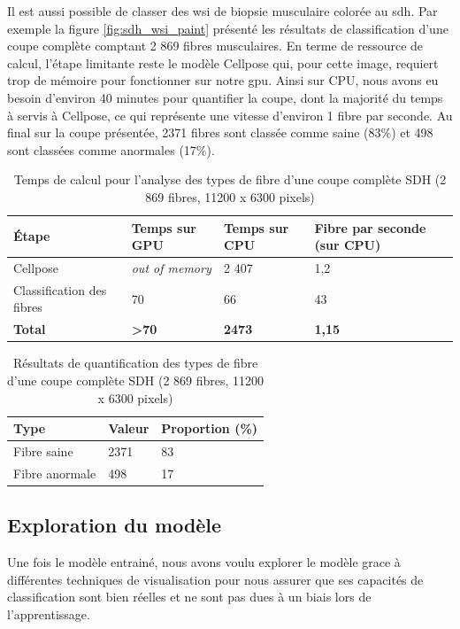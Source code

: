 Il est aussi possible de classer des \gls{wsi} de biopsie musculaire colorée au \gls{sdh}. Par exemple la figure \ref{fig:sdh_wsi_paint} présenté les résultats de classification d'une coupe complète comptant 2 869 fibres musculaires. En terme de ressource de calcul, l'étape limitante reste le modèle Cellpose qui, pour cette image, requiert trop de mémoire pour fonctionner sur notre \gls{gpu}. Ainsi sur CPU, nous avons eu besoin d'environ 40 minutes pour quantifier la coupe, dont la majorité du temps à servis à Cellpose,  ce qui représente une vitesse d'environ 1 fibre par seconde. Au final sur la coupe présentée, 2371 fibres sont classée comme saine (83\%) et 498 sont classées comme anormales (17\%).

\begin{table}[htbp]
\centering
\caption{Temps de calcul pour l'analyse des types de fibre d'une coupe complète SDH (2 869 fibres, 11200 x 6300 pixels)}
\label{tab:sdh_wsi_timetable}
\begin{tabularx}{\textwidth}{|X|X|X|X|}
\hline
\textbf{Étape} & \textbf{Temps sur GPU} & \textbf{Temps sur CPU} & \textbf{Fibre par seconde (sur CPU)} \\
\toprule
Cellpose & \textit{out of memory} & 2 407 & 1,2 \\
\hline
Classification des fibres & 70 & 66 & 43 \\
\hline
\textbf{Total} & \textbf{>70} & \textbf{2473} & \textbf{1,15} \\
\hline
\end{tabularx}
\end{table}
\begin{table}[htbp]
\centering
\caption{Résultats de quantification des types de fibre d'une coupe complète SDH (2 869 fibres, 11200 x 6300 pixels)}
\label{tab:sdh_wsi_resultstable}
\begin{tabularx}{\textwidth}{|X|X|X|}
\hline
\textbf{Type} & \textbf{Valeur} & \textbf{Proportion (\%)} \\
\toprule
Fibre saine & 2371 & 83 \\
\hline
Fibre anormale & 498 & 17 \\
\hline
\end{tabularx}
\end{table}


\subsection{Exploration du modèle}
Une fois le modèle entrainé, nous avons voulu explorer le modèle grace à différentes  techniques de visualisation pour nous assurer que ses capacités de classification sont bien réelles et ne sont pas dues à un biais lors de l'apprentissage.

